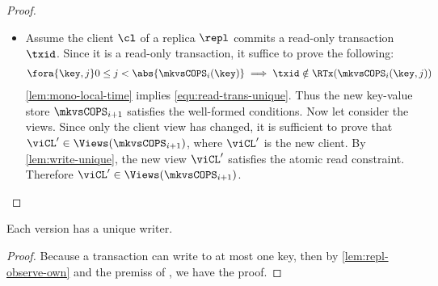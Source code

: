 \begin{proof}
\begin{itemize}
\begin{itemize}
            \item {}
                Assume the client \( \cl \) of a replica \( \repl \) commits a read-only transaction \( \txid \).
                Since it is a read-only transaction, it suffice  to prove the following:
                \begin{gather}
                    \fora{\key,j} 0 \leq j < \abs{ \mkvsCOPS_i(\key) } \implies \txid \notin \RTx(\mkvsCOPS_{i}(\key, j)) \label{equ:read-trans-unique} 
                \end{gather}
                \cref{lem:mono-local-time} implies \cref{equ:read-trans-unique}.
                Thus the new key-value store \( \mkvsCOPS_{i+1} \) satisfies the well-formed conditions.
                Now let consider the views.
                Since only the client view has changed, it is sufficient to  prove that \( \viCL' \in \Views(\mkvsCOPS_{i+1}) \), 
                where \( \viCL' \) is the new client.
                By \cref{lem:write-unique}, the new view \( \viCL' \) satisfies the atomic read constraint.
                Therefore \( \viCL' \in \Views(\mkvsCOPS_{i+1})  \).
        \end{itemize}
    \end{itemize}
\end{proof}


\begin{lemma}
    \label{lem:write-unique}
    Each version has a unique writer.
\end{lemma}
\begin{proof}
    Because a transaction can write to at most one key, then by \cref{lem:repl-observe-own} and the premiss of ,
    we have the proof.
\end{proof}

